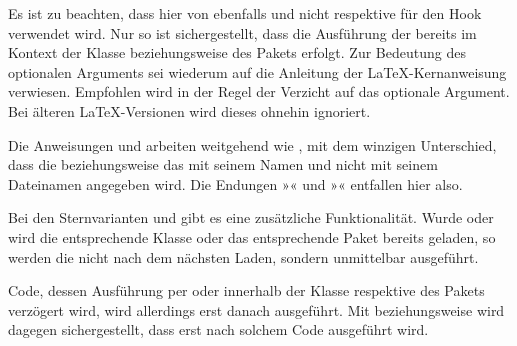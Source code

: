 Es ist zu beachten, dass hier von 
ebenfalls  und nicht  respektive 
für den Hook verwendet wird. Nur so ist sichergestellt, dass die Ausführung
der  bereits im Kontext der Klasse beziehungsweise des
Pakets erfolgt. Zur Bedeutung des optionalen Arguments  sei
wiederum auf die Anleitung der \LaTeX-Kernanweisung
 verwiesen. Empfohlen wird in der Regel
der Verzicht auf das optionale Argument. Bei älteren \LaTeX-Versionen wird
dieses ohnehin ignoriert.%
\EndIndexGroup


\begin{Declaration}
\end{Declaration}%
Die Anweisungen
 und  arbeiten weitgehend wie
, mit dem winzigen Unterschied, dass die
 beziehungsweise das  mit seinem Namen und nicht
mit seinem Dateinamen angegeben wird. Die Endungen »« und
»« entfallen hier also.

Bei den
Sternvarianten  und  gibt es eine
zusätzliche Funktionalität. Wurde oder wird die entsprechende Klasse oder das
entsprechende Paket bereits geladen, so werden die  nicht
nach dem nächsten Laden, sondern unmittelbar ausgeführt.

Code,%
dessen Ausführung per  oder
 innerhalb der Klasse
respektive des Pakets verzögert wird, wird allerdings erst danach
ausgeführt. Mit  beziehungsweise
 wird dagegen sichergestellt, dass
 erst nach solchem Code ausgeführt wird.

